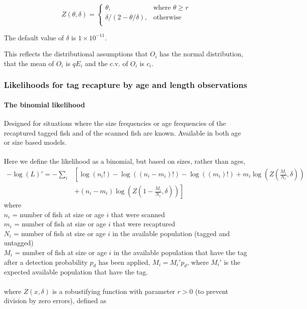 \begin{equation}
Z \left(\theta,\delta \right) = \begin{cases}
\theta, & \text{where $\theta \ge r$} \\
\delta/\left( 2-\theta/\delta \right), & \text{otherwise} \\  
\end{cases}
\end{equation}

The default value of $\delta$ is $1 \times 10^{-11}$.

This reflects the distributional assumptions that  $O_i$ has the normal distribution, that the mean of $O_i$ is $qE_i$  and the c.v. of $O_i$ is $c_i$.

\subsubsection{Likelihoods for tag recapture by age and length observations}
\paragraph*{The binomial likelihood}
Designed for situations where the size frequencies or age frequencies of the recaptured tagged fish and of the scanned fish are known. Available in both age or size based models.
\\\\
Here we define the likelihood as a binomial, but based on sizes, rather than ages,
\begin{equation}
\begin{split}
-\log \left(L \right)'= -\sum\limits_i & \left[ \right. \log \left(n_i! \right) - \log \left(\left(n_i - m_i \right)! \right) - \log \left(\left(m_i \right)! \right) + m_i \log \left(Z\left(\frac{M_i}{N_i},\delta \right) \right) \\
&+  \left(n_i - m_i \right)\log \left(Z\left(1 - \frac{M_i}{N_i},\delta\right) \right) \left. \right]
\end{split}
\end{equation}
where 
\\
$n_i$ = number of fish at size or age $i$ that were scanned
\\
$m_i$ = number of fish at size or age $i$ that were recaptured
\\
$N_i$ = number of fish at size or age $i$ in the available population (tagged and untagged)
\\
$M_i$ = number of fish at size or age $i$ in the available population that have the tag after a detection probability $p_d$ has been applied, $M_i = M_i'p_d$, where $M_i'$ is the expected available population that have the tag.
\\\\
where $Z(x,\delta)$ is a robustifying function with parameter $r > 0$ (to prevent division by zero errors), defined as


